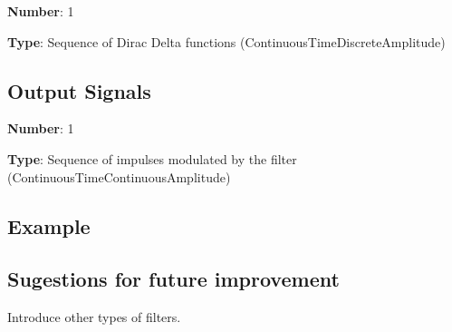 \documentclass[a4paper]{article}
\begin{document}
\textbf{Number}: 1

\textbf{Type}: Sequence of Dirac Delta functions (ContinuousTimeDiscreteAmplitude)

\subsection*{Output Signals}

\textbf{Number}: 1

\textbf{Type}: Sequence of impulses modulated by the filter (ContinuousTimeContinuousAmplitude)

\subsection*{Example}


\subsection*{Sugestions for future improvement}

Introduce other types of filters.
\end{document}
